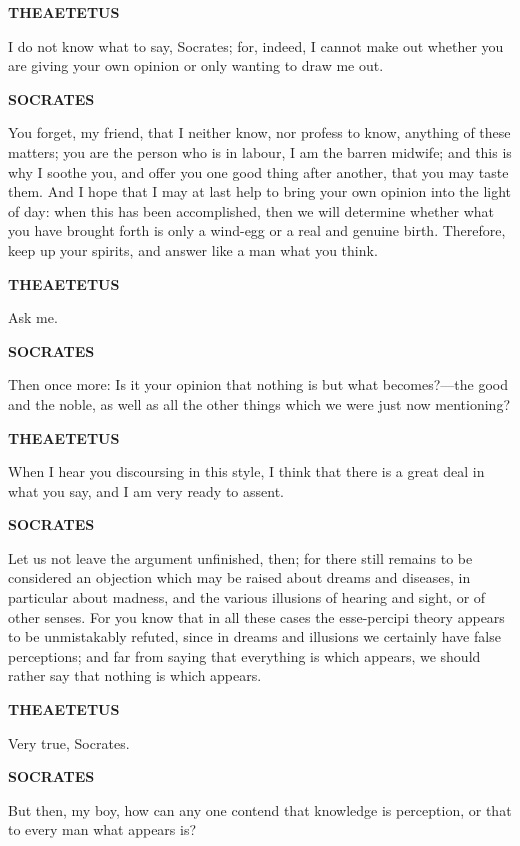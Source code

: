 \documentclass[11pt,letter]{article}
\begin{document}
\par \textbf{THEAETETUS}
\par   I do not know what to say, Socrates; for, indeed, I cannot make out whether you are giving your own opinion or only wanting to draw me out.

\par \textbf{SOCRATES}
\par   You forget, my friend, that I neither know, nor profess to know, anything of these matters; you are the person who is in labour, I am the barren midwife; and this is why I soothe you, and offer you one good thing after another, that you may taste them. And I hope that I may at last help to bring your own opinion into the light of day:  when this has been accomplished, then we will determine whether what you have brought forth is only a wind-egg or a real and genuine birth. Therefore, keep up your spirits, and answer like a man what you think.

\par \textbf{THEAETETUS}
\par   Ask me.

\par \textbf{SOCRATES}
\par   Then once more:  Is it your opinion that nothing is but what becomes?—the good and the noble, as well as all the other things which we were just now mentioning?

\par \textbf{THEAETETUS}
\par   When I hear you discoursing in this style, I think that there is a great deal in what you say, and I am very ready to assent.

\par \textbf{SOCRATES}
\par   Let us not leave the argument unfinished, then; for there still remains to be considered an objection which may be raised about dreams and diseases, in particular about madness, and the various illusions of hearing and sight, or of other senses. For you know that in all these cases the esse-percipi theory appears to be unmistakably refuted, since in dreams and illusions we certainly have false perceptions; and far from saying that everything is which appears, we should rather say that nothing is which appears.

\par \textbf{THEAETETUS}
\par   Very true, Socrates.

\par \textbf{SOCRATES}
\par   But then, my boy, how can any one contend that knowledge is perception, or that to every man what appears is?
\end{document}
